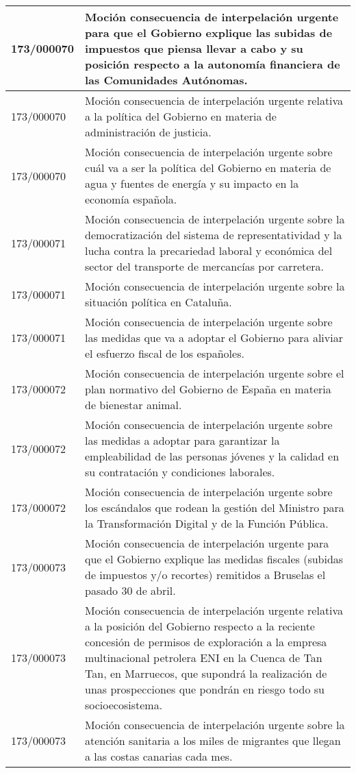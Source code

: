 {\begin{table}[H]
\begin{center}
\begin{tabularx}{\linewidth}{| l | X |}
\hline
173/000070 & Moción consecuencia de interpelación urgente para que el Gobierno explique las subidas de impuestos que piensa llevar a cabo y su posición respecto a la autonomía financiera de las Comunidades Autónomas. \\
\hline
173/000070 & Moción consecuencia de interpelación urgente relativa a la política del Gobierno en materia de administración de justicia. \\
\hline
173/000070 & Moción consecuencia de interpelación urgente sobre cuál va a ser la política del Gobierno en materia de agua y fuentes de energía y su impacto en la economía española. \\
\hline
173/000071 & Moción consecuencia de interpelación urgente sobre la democratización del sistema de representatividad y la lucha contra la precariedad laboral y económica del sector del transporte de mercancías por carretera. \\
\hline
173/000071 & Moción consecuencia de interpelación urgente sobre la situación política en Cataluña. \\
\hline
173/000071 & Moción consecuencia de interpelación urgente sobre las medidas que va a adoptar el Gobierno para aliviar el esfuerzo fiscal de los españoles. \\
\hline
173/000072 & Moción consecuencia de interpelación urgente sobre el plan normativo del Gobierno de España en materia de bienestar animal. \\
\hline
173/000072 & Moción consecuencia de interpelación urgente sobre las medidas a adoptar para garantizar la empleabilidad de las personas jóvenes y la calidad en su contratación y condiciones laborales. \\
\hline
173/000072 & Moción consecuencia de interpelación urgente sobre los escándalos que rodean la gestión del Ministro para la Transformación Digital y de la Función Pública. \\
\hline
173/000073 & Moción consecuencia de interpelación urgente para que el Gobierno explique las medidas fiscales (subidas de impuestos y/o recortes) remitidos a Bruselas el pasado 30 de abril. \\
\hline
173/000073 & Moción consecuencia de interpelación urgente relativa a la posición del Gobierno respecto a la reciente concesión de permisos de exploración a la empresa multinacional petrolera ENI en la Cuenca de Tan Tan, en Marruecos, que supondrá la realización de unas prospecciones que pondrán en riesgo todo su socioecosistema. \\
\hline
173/000073 & Moción consecuencia de interpelación urgente sobre la atención sanitaria a los miles de migrantes que llegan a las costas canarias cada mes. \\

\end{tabularx}
\end{center}
\end{table}}
